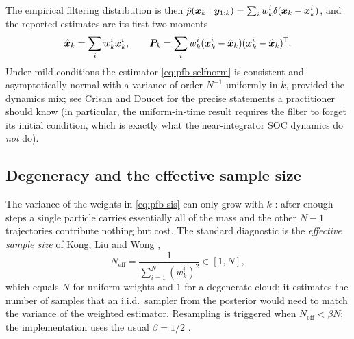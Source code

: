 The empirical filtering distribution is then
$\hat p(\bm{x}_k\mid\bm{y}_{1:k}) = \sum_i w_k^i \delta(\bm{x}_k - \bm{x}_k^i)$, and the reported estimates are
its first two moments
\begin{equation}
  \hat{\bm{x}}_k = \sum_{i} w_k^i \bm{x}_k^i, \qquad
  \bm{P}_k   = \sum_{i} w_k^i (\bm{x}_k^i - \hat{\bm{x}}_k)(\bm{x}_k^i - \hat{\bm{x}}_k)^{\mathsf{T}} .
  \label{eq:pfb-moments}
\end{equation}
Under mild conditions the estimator \eqref{eq:pfb-selfnorm} is consistent and asymptotically
normal with a variance of order $N^{-1}$ uniformly in $k$, provided the dynamics mix; see Crisan
and Doucet \cite{crisan2002convergence} for the precise statements a practitioner should know
(in particular, the uniform-in-time result requires the filter to forget its initial condition,
which is exactly what the near-integrator SOC dynamics do \emph{not} do).

\subsection{Degeneracy and the effective sample size}
The variance of the weights in \eqref{eq:pfb-sis} can only grow with $k$ \cite[Prop.~1]{doucet2000smc}:
after enough steps a single particle carries essentially all of the mass and the other $N-1$
trajectories contribute nothing but cost.  The standard diagnostic is the \emph{effective sample
size} of Kong, Liu and Wong \cite{kong1994},
\begin{equation}
  N_{\mathrm{eff}} = \frac{1}{\sum_{i=1}^N (w_k^i)^2} \in [1, N],
  \label{eq:pfb-ess}
\end{equation}
which equals $N$ for uniform weights and $1$ for a degenerate cloud; it estimates the number of
samples that an i.i.d.\ sampler from the posterior would need to match the variance of the weighted
estimator.  Resampling is triggered when $N_{\mathrm{eff}} < \beta N$; the implementation uses the
usual $\beta = 1/2$ \cite{liuchen1998,arulampalam2002}.

